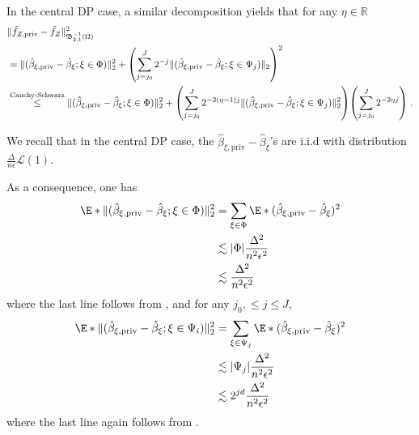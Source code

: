 \documentclass{article}
\newcommand{\R}{\mathbb{R}}
\newcommand{\1}{\mathds{1}}
\DeclarePairedDelimiter{\paren}{\lparen}{\rparen}
\theoremstyle{plain}
\theoremstyle{definition}
\theoremstyle{remark}
\begin{document}
In the central DP case, a similar decomposition yields that for any $\eta \in \R$
\begin{equation}
\begin{aligned}
    &\| \tilde{f}_{Z, \textrm{priv}} - \tilde{f}_{Z}\|_{{\mathfrak{B}}_{2, 1}^{-1}(\Omega)}^2 \\
    &= \| (\hat{\beta}_{\xi, \textrm{priv}} - \hat{\beta}_{\xi};  \xi \in \Phi) \|_2^2
    + \paren*{\sum_{j = j_0}^J 2^{-j} \|(\hat{\beta}_{\xi, \textrm{priv}} - \hat{\beta}_{\xi};  \xi \in \Psi_j) \|_{2}}^2 \\
    &\overset{\text{Cauchy-Schwarz}}{\leq }
    \| (\hat{\beta}_{\xi, \textrm{priv}} - \hat{\beta}_{\xi};  \xi \in \Phi) \|_2^2
    + \paren*{\sum_{j = j_0}^J 2^{-2 (\eta - 1)j} \|(\hat{\beta}_{\xi, \textrm{priv}} - \hat{\beta}_{\xi};  \xi \in \Psi_j) \|_{2}^2}
    \paren*{\sum_{j = j_0}^J 2^{-2 \eta j} } \;.
\end{aligned}
\end{equation}

We recall that in the central DP case, the $\hat{\beta}_{\xi, \textrm{priv}} - \hat{\beta}_{\xi}$'s are i.i.d with distribution $\frac{\Delta}{n \epsilon} \mathcal{L} (1)$. 

As a consequence, one has
\begin{equation}
    \begin{aligned}
        \E*{\| (\hat{\beta}_{\xi, \textrm{priv}} - \hat{\beta}_{\xi};  \xi \in \Phi) \|_2^2}
        &= \sum_{\xi \in \Phi} \E*{(\hat{\beta}_{\xi, \textrm{priv}} - \hat{\beta}_{\xi})^2} \\
        &\lesssim |\Phi| \frac{\Delta^2}{n^2 \epsilon^2} \\
        &\lesssim \frac{\Delta^2}{n^2 \epsilon^2}
    \end{aligned}
\end{equation}
where the last line follows from , and for any $j_0, \leq j \leq J$,
\begin{equation}
    \begin{aligned}
        \E*{\| (\hat{\beta}_{\xi, \textrm{priv}} - \hat{\beta}_{\xi};  \xi \in \Psi_i) \|_2^2}
        &= \sum_{\xi \in \Psi_j} \E*{(\hat{\beta}_{\xi, \textrm{priv}} - \hat{\beta}_{\xi})^2} \\
        &\lesssim |\Psi_j| \frac{\Delta^2}{n^2 \epsilon^2} \\
        &\lesssim 2^{j d} \frac{\Delta^2}{n^2 \epsilon^2}
    \end{aligned}
\end{equation}
where the last line again follows from .
\end{document}

